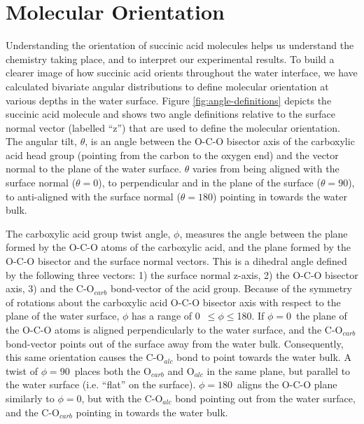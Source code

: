 \section {Molecular Orientation}

Understanding the orientation of succinic acid molecules helps us understand the chemistry taking place, and to interpret our experimental results. To build a clearer image of how succinic acid orients throughout the water interface, we have calculated bivariate angular distributions to define molecular orientation at various depths in the water surface. Figure \ref{fig:angle-definitions} depicts the succinic acid molecule and shows two angle definitions relative to the surface normal vector (labelled ``z'') that are used to define the molecular orientation. The angular tilt, $\theta$, is an angle between the O-C-O bisector axis of the carboxylic acid head group (pointing from the carbon to the oxygen end) and the vector normal to the plane of the water surface. $\theta$ varies from being aligned with the surface normal ($\theta=0$\textdegree), to perpendicular and in the plane of the surface ($\theta=90$\textdegree), to anti-aligned with the surface normal ($\theta=180$\textdegree) pointing in towards the water bulk. 

The carboxylic acid group twist angle, $\phi$, measures the angle between the plane formed by the O-C-O atoms of the carboxylic acid, and the plane formed by the O-C-O bisector and the surface normal vectors. This is a dihedral angle defined by the following three vectors: 1) the surface normal z-axis, 2) the O-C-O bisector axis, 3) and the C-O$_{carb}$ bond-vector of the acid group. Because of the symmetry of rotations about the carboxylic acid O-C-O bisector axis with respect to the plane of the water surface, $\phi$ has a range of 0\textdegree~$ \le \phi \le $180\textdegree. If $\phi=0$\textdegree~the plane of the O-C-O atoms is aligned perpendicularly to the water surface, and the C-O$_{carb}$ bond-vector points out of the surface away from the water bulk. Consequently, this same orientation causes the C-O$_{alc}$ bond to point towards the water bulk. A twist of $\phi=90$\textdegree~places both the O$_{carb}$ and O$_{alc}$ in the same plane, but parallel to the water surface (i.e. ``flat'' on the surface). $\phi=180$\textdegree~aligns the O-C-O plane similarly to $\phi=0$\textdegree, but with the C-O$_{alc}$ bond pointing out from the water surface, and the C-O$_{carb}$ pointing in towards the water bulk. 

